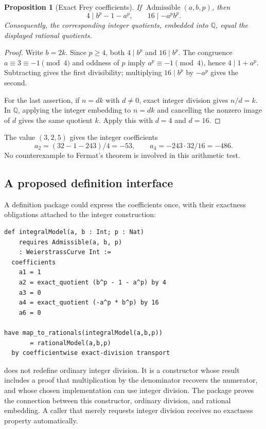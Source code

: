 \documentclass[11pt,a4paper]{article}
\newcommand{\code}[1]{\texttt{\detokenize{#1}}}
\newcommand{\Q}{\mathbb Q}\newcommand{\R}{\mathbb R}
\theoremstyle{plain}\newtheorem{proposition}{Proposition}[section]
\theoremstyle{definition}\newtheorem{definition}[proposition]{Definition}
\theoremstyle{remark}\newtheorem{remark}[proposition]{Remark}
\begin{document}
\begin{proposition}[Exact Frey coefficients]\label{prop:frey}
If \(\operatorname{Admissible}(a,b,p)\), then
\[
 4\mid b^p-1-a^p,
 \qquad
 16\mid -a^p b^p.
\]
Consequently, the corresponding integer quotients, embedded into \(\Q\), equal the displayed rational quotients.
\end{proposition}
\begin{proof}
Write \(b=2k\). Since \(p\ge4\), both \(4\mid b^p\) and \(16\mid b^p\). The congruence \(a\equiv3\equiv-1\pmod4\) and oddness of \(p\) imply \(a^p\equiv-1\pmod4\), hence \(4\mid1+a^p\). Subtracting gives the first divisibility; multiplying \(16\mid b^p\) by \(-a^p\) gives the second.

For the last assertion, if \(n=dk\) with \(d\ne0\), exact integer division gives \(n/d=k\). In \(\Q\), applying the integer embedding to \(n=dk\) and cancelling the nonzero image of \(d\) gives the same quotient \(k\). Apply this with \(d=4\) and \(d=16\).
\end{proof}

The value \((3,2,5)\) gives the integer coefficients
\[
 a_2=(32-1-243)/4=-53,
 \qquad a_4=-243\cdot32/16=-486.
\]
No counterexample to Fermat's theorem is involved in this arithmetic test.

\subsection{A proposed definition interface}
A definition package could express the coefficients once, with their exactness obligations attached to the integer construction:
\begin{lstlisting}
def integralModel(a, b : Int; p : Nat)
    requires Admissible(a, b, p)
    : WeierstrassCurve Int :=
  coefficients
    a1 = 1
    a2 = exact_quotient (b^p - 1 - a^p) by 4
    a3 = 0
    a4 = exact_quotient (-a^p * b^p) by 16
    a6 = 0

have map_to_rationals(integralModel(a,b,p))
       = rationalModel(a,b,p)
  by coefficientwise exact-division transport
\end{lstlisting}

\code{exact_quotient} does not redefine ordinary integer division. It is a constructor whose result includes a proof that multiplication by the denominator recovers the numerator, and whose chosen implementation can use integer division. The package proves the connection between this constructor, ordinary division, and rational embedding. A caller that merely requests integer division receives no exactness property automatically.
\end{document}
